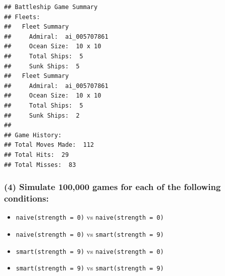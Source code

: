 \documentclass[
]{article}
\begin{document}
\begin{verbatim}
## Battleship Game Summary
## Fleets:
##   Fleet Summary
##     Admiral:  ai_005707861 
##     Ocean Size:  10 x 10 
##     Total Ships:  5 
##     Sunk Ships:  5 
##   Fleet Summary
##     Admiral:  ai_005707861 
##     Ocean Size:  10 x 10 
##     Total Ships:  5 
##     Sunk Ships:  2 
## 
## Game History:
## Total Moves Made:  112 
## Total Hits:  29 
## Total Misses:  83
\end{verbatim}

\subsubsection{(4) Simulate 100,000 games for each of the following
conditions:}\label{simulate-100000-games-for-each-of-the-following-conditions}

\begin{itemize}
  \item \texttt{naive(strength = 0)} vs \texttt{naive(strength = 0)} 
  \item \texttt{naive(strength = 0)} vs \texttt{smart(strength = 9)}
  \item \texttt{smart(strength = 9)} vs \texttt{naive(strength = 0)}
  \item \texttt{smart(strength = 9)} vs \texttt{smart(strength = 9)}
\end{itemize}
\end{document}
